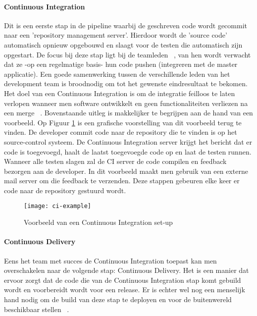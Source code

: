 
    \paragraph{Continuous Integration}
    Dit is een eerste stap in de pipeline waarbij de geschreven code wordt gecommit naar een 'repository management server'. Hierdoor wordt de 'source code' automatisch opnieuw opgebouwd en slaagt voor de testen die automatisch zijn opgestart. De focus bij deze stap ligt bij de teamleden ~\autocite{Fowler2006}, van hen wordt verwacht dat ze -op een regelmatige basis- hun code pushen (integreren met de master applicatie). Een goede samenwerking tussen de verschillende leden van het development team is broodnodig om tot het gewenste eindresultaat te bekomen.
    Het doel van een Continuous Integration is om de integratie feilloos te laten verlopen wanneer men software ontwikkelt en geen functionaliteiten verliezen na een merge ~\autocite{Riti2018}.
    \newline
    Bovenstaande uitleg is makkelijker te begrijpen aan de hand van een voorbeeld. Op Figuur \ref{img-ci-example} is een grafische voorstelling van dit voorbeeld terug te vinden.
    De developer commit code naar de repository die te vinden is op het source-control systeem. De Continuous Integration server krijgt het bericht dat er code is toegevoegd, haalt de laatst toegevoegde code op en laat de testen runnen. Wanneer alle testen slagen zal de CI server de code compilen en feedback bezorgen aan de developer. In dit voorbeeld maakt men gebruik van een externe mail server om die feedback te verzenden.
    Deze stappen gebeuren elke keer er code naar de repository gestuurd wordt.
    \begin{figure}	
        \texttt{[image: ci-example]}
        \caption{Voorbeeld van een Continuous Integration set-up ~\autocite{Riti2018}} \label{img-ci-example}
    \end{figure}

    \paragraph{Continuous Delivery}
    Eens het team met succes de Continuous Integration toepast kan men overschakelen naar de volgende stap: Continuous Delivery.
    Het is een manier dat ervoor zorgt dat de code die van de Continuous Integration stap komt gebuild wordt en voorbereidt wordt voor een release.
    Er is echter wel nog een menselijk hand nodig om de build van deze stap te deployen en voor de buitenwereld beschikbaar stellen ~\autocite{Fowler2013}.
    


